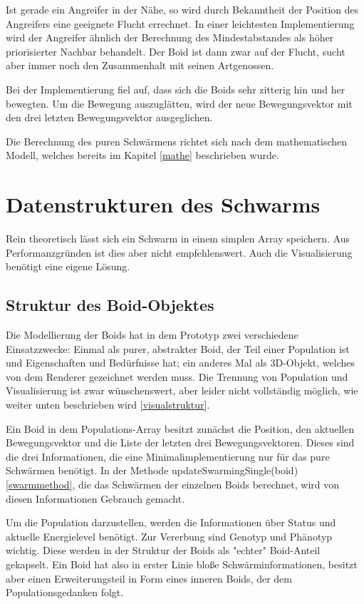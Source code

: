 \documentclass[draft=false
              ,paper=a4
              ,twoside=false
              ,fontsize=11pt
              ,headsepline
              ,BCOR10mm
              ,DIV11
              ,bibtotoc
              ,liststotoc
              ]{scrbook}
\begin{document}
Ist gerade ein Angreifer in der Nähe, so wird durch Bekanntheit der Position des Angreifers eine geeignete Flucht errechnet. In einer leichtesten Implementierung wird der Angreifer ähnlich der Berechnung des Mindestabstandes als höher priorisierter Nachbar behandelt. Der Boid ist dann zwar auf der Flucht, sucht aber immer noch den Zusammenhalt mit seinen Artgenossen.

Bei der Implementierung fiel auf, dass sich die Boids sehr zitterig hin und her bewegten. Um die Bewegung auszuglätten, wird der neue Bewegungsvektor mit den drei letzten Bewegungsvektor ausgeglichen.

Die Berechnung des puren Schwärmens richtet sich nach dem mathematischen Modell, welches bereits im Kapitel \ref{mathe} beschrieben wurde.

\section{Datenstrukturen des Schwarms}
Rein theoretisch lässt sich ein Schwarm in einem simplen Array speichern. Aus Performanzgründen ist dies aber nicht empfehlenswert. Auch die Visualisierung benötigt eine eigene Lösung.
\subsection{Struktur des Boid-Objektes}
Die Modellierung der Boids hat in dem Prototyp zwei verschiedene Einsatzzwecke: Einmal als purer, abstrakter Boid, der Teil einer Population ist und Eigenschaften und Bedürfnisse hat; ein anderes Mal als 3D-Objekt, welches von dem Renderer gezeichnet werden muss. Die Trennung von Population und Visualisierung ist zwar wünschenswert, aber leider nicht vollständig möglich, wie weiter unten beschrieben wird \ref{visualstruktur}.

Ein Boid in dem Populations-Array besitzt zunächst die Position, den aktuellen Bewegungsvektor und die Liste der letzten drei Bewegungsvektoren. Dieses sind die drei Informationen, die eine Minimalimplementierung nur für das pure Schwärmen benötigt. In der Methode updateSwarmingSingle(boid) \ref{swarmmethod}, die das Schwärmen der einzelnen Boids berechnet, wird von diesen Informationen Gebrauch gemacht.

Um die Population darzustellen, werden die Informationen über Status und aktuelle Energielevel benötigt. Zur Vererbung sind Genotyp und Phänotyp wichtig. Diese werden in der Struktur der Boids als "{}echter"{} Boid-Anteil gekapselt. Ein Boid hat also in erster Linie bloße Schwärminformationen, besitzt aber einen Erweiterungsteil in Form eines inneren Boids, der dem Populationsgedanken folgt.
\end{document}
